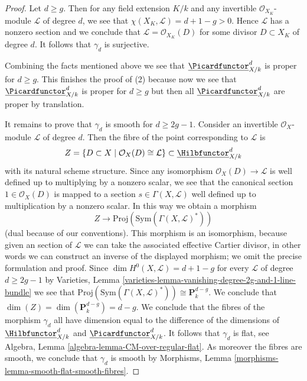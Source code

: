 \begin{proof}
\medskip\noindent
Let $d \geq g$. Then for any field extension $K/k$ and any invertible
$\mathcal{O}_{X_K}$-module $\mathcal{L}$ of degree $d$, we see that
$\chi(X_K, \mathcal{L}) = d + 1 - g > 0$. Hence $\mathcal{L}$ has a
nonzero section and we conclude that $\mathcal{L} = \mathcal{O}_{X_K}(D)$
for some divisor $D \subset X_K$ of degree $d$. It follows that
$\gamma_d$ is surjective.

\medskip\noindent
Combining the facts mentioned above we see that
$\underline{\Picardfunctor}^d_{X/k}$ is proper for $d \geq g$.
This finishes the proof of (2) because now we see that
$\underline{\Picardfunctor}^d_{X/k}$ is proper for $d \geq g$ but
then all $\underline{\Picardfunctor}^d_{X/k}$ are proper by translation.

\medskip\noindent
It remains to prove that $\gamma_d$ is smooth for $d \geq 2g - 1$.
Consider an invertible $\mathcal{O}_X$-module $\mathcal{L}$ of degree
$d$. Then the fibre of the point corresponding to $\mathcal{L}$ is
$$
Z = \{D \subset X \mid \mathcal{O}_X(D) \cong \mathcal{L}\} \subset
\underline{\Hilbfunctor}^d_{X/k}
$$
with its natural scheme structure. Since any isomorphism
$\mathcal{O}_X(D) \to \mathcal{L}$ is well defined up
to multiplying by a nonzero scalar, we see that the canonical
section $1 \in \mathcal{O}_X(D)$ is mapped to a section
$s \in \Gamma(X, \mathcal{L})$ well defined up to multiplication
by a nonzero scalar. In this way we obtain a morphism
$$
Z \longrightarrow
\text{Proj}(\text{Sym}(\Gamma(X, \mathcal{L})^*))
$$
(dual because of our conventions). This morphism is an isomorphism,
because given an section of $\mathcal{L}$ we can take the associated
effective Cartier divisor, in other words we can construct an inverse of
the displayed morphism; we omit the precise formulation and proof.
Since $\dim H^0(X, \mathcal{L}) = d + 1 - g$ for every
$\mathcal{L}$ of degree $d \geq 2g - 1$ by
Varieties, Lemma \ref{varieties-lemma-vanishing-degree-2g-and-1-line-bundle}
we see that $\text{Proj}(\text{Sym}(\Gamma(X, \mathcal{L})^*))
\cong \mathbf{P}^{d - g}_k$.
We conclude that $\dim(Z) = \dim(\mathbf{P}^{d - g}_k) = d - g$.
We conclude that the fibres of the morphism $\gamma_d$ all
have dimension equal to the difference of the dimensions of
$\underline{\Hilbfunctor}^d_{X/k}$ and $\underline{\Picardfunctor}^d_{X/k}$.
It follows that $\gamma_d$ is flat, see
Algebra, Lemma \ref{algebra-lemma-CM-over-regular-flat}.
As moreover the fibres are smooth, we conclude that $\gamma_d$
is smooth by Morphisms, Lemma \ref{morphisms-lemma-smooth-flat-smooth-fibres}.
\end{proof}

